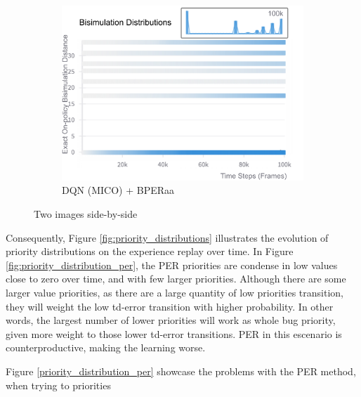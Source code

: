 \begin{figure}[h]
\begin{subfigure}{0.32\textwidth}
        \includegraphics[width=\linewidth]{Results/grid_world/exact_bisimulation_dqn_mico_bperaa.png}
        \caption{DQN (MICO) + BPERaa}
        \label{fig:exact_bisim_bperaa}
    \end{subfigure}
    \caption{Two images side-by-side}
    \label{fig:exact_bisimulation_distributions}
\end{figure}

Consequently, Figure \ref{fig:priority_distributions} illustrates the evolution of priority distributions on the experience replay over time. In Figure \ref{fig:priority_distribution_per}, the PER priorities are condense in low values close to zero over time, and with few larger priorities. Although there are some larger value priorities, as there are a large quantity of low priorities transition, they will weight the low td-error transition with higher probability. In other words, the largest number of lower priorities will work as whole bug priority, given more weight to those lower td-error transitions. PER in this escenario is counterproductive, making the learning worse.

Figure \ref{priority_distribution_per} showcase the problems with the PER method, when trying to priorities 

